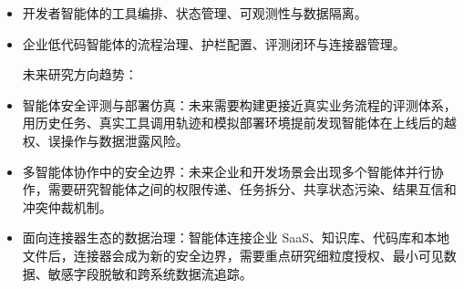 \begin{longtblr}[
  caption = {北美主流AI智能体安全产品与落地方向},
  label   = {tab:north-america-agent-security-products},
]
\begin{itemize}[leftmargin=*,topsep=0pt,partopsep=0pt,itemsep=1pt,parsep=0pt]
    \item 开发者智能体的工具编排、状态管理、可观测性与数据隔离。
   
    \item 企业低代码智能体的流程治理、护栏配置、评测闭环与连接器管理。

    未来研究方向趋势：
    \item 智能体安全评测与部署仿真：未来需要构建更接近真实业务流程的评测体系，用历史任务、真实工具调用轨迹和模拟部署环境提前发现智能体在上线后的越权、误操作与数据泄露风险。~\cite{openaideploymentsimulation2026}
    \item 多智能体协作中的安全边界：未来企业和开发场景会出现多个智能体并行协作，需要研究智能体之间的权限传递、任务拆分、共享状态污染、结果互信和冲突仲裁机制。~\cite{openaitoolsagents2025,xu2025trustparadox}
    \item 面向连接器生态的数据治理：智能体连接企业 SaaS、知识库、代码库和本地文件后，连接器会成为新的安全边界，需要重点研究细粒度授权、最小可见数据、敏感字段脱敏和跨系统数据流追踪。~\cite{openaiagentkit2025,hou2025mcp,wang2025mcptox}


\end{itemize}
\end{longtblr}
